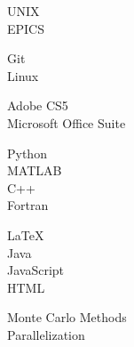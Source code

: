 
{
	\hspace*{9pt}
	\begin{minipage}[t]{0.30\textwidth}
		UNIX\\
		EPICS
	\end{minipage}
	\begin{minipage}[t]{0.30\textwidth}
		Git\\
		Linux
	\end{minipage}
	\begin{minipage}[t]{0.30\textwidth}
		Adobe CS5\\
		Microsoft Office Suite
	\end{minipage}
}

\vspace*{4pt}
{
	\hspace*{9pt}
	\begin{minipage}[t]{0.30\textwidth}
		Python\\
		MATLAB\\
		C++\\
		Fortran
	\end{minipage}
	\begin{minipage}[t]{0.30\textwidth}
		\LaTeX\\
		Java\\
		JavaScript\\
		HTML
	\end{minipage}
	\begin{minipage}[t]{0.30\textwidth}
		Monte Carlo Methods\\
		Parallelization
	\end{minipage}
}


